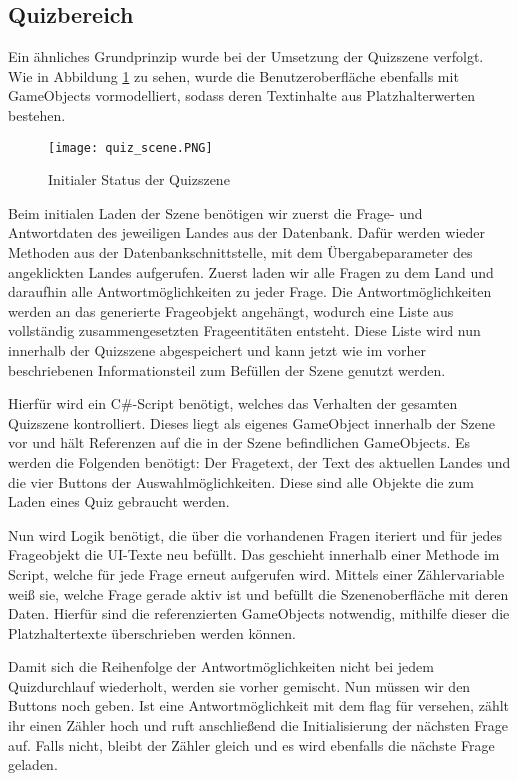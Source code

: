 \subsection{Quizbereich}
Ein ähnliches Grundprinzip wurde bei der Umsetzung der Quizszene verfolgt.
Wie in Abbildung \ref{fig:quizscene} zu sehen, wurde die Benutzeroberfläche ebenfalls mit GameObjects vormodelliert, sodass deren Textinhalte aus Platzhalterwerten bestehen.

\begin{figure} [h]
\centering
\texttt{[image: quiz\_scene.PNG]}
\caption{Initialer Status der Quizszene}
\label{fig:quizscene}
\end{figure}

Beim initialen Laden der Szene benötigen wir zuerst die Frage- und Antwortdaten des jeweiligen Landes aus der Datenbank.
Dafür werden wieder Methoden aus der Datenbankschnittstelle, mit dem Übergabeparameter des angeklickten Landes aufgerufen. 
Zuerst laden wir alle Fragen zu dem Land und daraufhin alle Antwortmöglichkeiten zu jeder Frage. 
Die Antwortmöglichkeiten werden an das generierte Frageobjekt angehängt, wodurch eine Liste aus vollständig zusammengesetzten Frageentitäten entsteht.
Diese Liste wird nun innerhalb der Quizszene abgespeichert und kann jetzt wie im vorher beschriebenen Informationsteil zum Befüllen der Szene genutzt werden.

Hierfür wird ein C\#-Script benötigt, welches das Verhalten der gesamten Quizszene kontrolliert.
Dieses liegt als eigenes GameObject innerhalb der Szene vor und hält Referenzen auf die in der Szene befindlichen GameObjects.
Es werden die Folgenden benötigt: Der Fragetext, der Text des aktuellen Landes und die vier Buttons der Auswahlmöglichkeiten.
Diese sind alle Objekte die zum Laden eines Quiz gebraucht werden.

Nun wird Logik benötigt, die über die vorhandenen Fragen iteriert und für jedes Frageobjekt die UI-Texte neu befüllt. Das geschieht innerhalb einer Methode im Script, welche für jede Frage erneut aufgerufen wird. 
Mittels einer Zählervariable weiß sie, welche Frage gerade aktiv ist und befüllt die Szenenoberfläche mit deren Daten.
Hierfür sind die referenzierten GameObjects notwendig, mithilfe dieser die Platzhaltertexte überschrieben werden können. 

Damit sich die Reihenfolge der Antwortmöglichkeiten nicht bei jedem Quizdurchlauf wiederholt, werden sie vorher gemischt. 
Nun müssen wir den Buttons noch  geben. 
Ist eine Antwortmöglichkeit mit dem flag für  versehen, zählt ihr  einen Zähler hoch und ruft anschließend die Initialisierung der nächsten Frage auf. 
Falls nicht, bleibt der Zähler gleich und es wird ebenfalls die nächste Frage geladen.